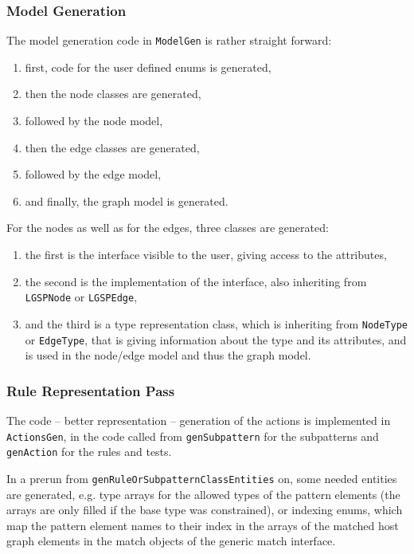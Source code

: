 \subsubsection*{Model Generation}

The model generation code in \texttt{ModelGen} is rather straight forward:
\begin{enumerate}
	\item first, code for the user defined enums is generated,
	\item then the node classes are generated,
	\item followed by the node model,
	\item then the edge classes are generated,
	\item followed by the edge model,
	\item and finally, the graph model is generated.
\end{enumerate}

\noindent For the nodes as well as for the edges, three classes are generated:
\begin{enumerate}
	\item the first is the interface visible to the user, giving access to the attributes,
	\item the second is the implementation of the interface, also inheriting from \texttt{LGSPNode} or \texttt{LGSPEdge},
	\item and the third is a type representation class, which is inheriting from \texttt{NodeType} or \texttt{EdgeType}, that is giving information about the type and its attributes, and is used in the node/edge model and thus the graph model.
\end{enumerate}


\subsubsection*{Rule Representation Pass}

The code -- better representation -- generation of the actions is implemented in \texttt{ActionsGen}, in the code called from \texttt{gen\-Subpattern} for the subpatterns and \texttt{gen\-Action} for the rules and tests.

In a prerun from \texttt{gen\-Rule\-Or\-Subpattern\-Class\-Entities} on, some needed entities are generated, e.g. type arrays for the allowed types of the pattern elements (the arrays are only filled if the base type was constrained), or indexing enums, which map the pattern element names to their index in the arrays of the matched host graph elements in the match objects of the generic match interface.


